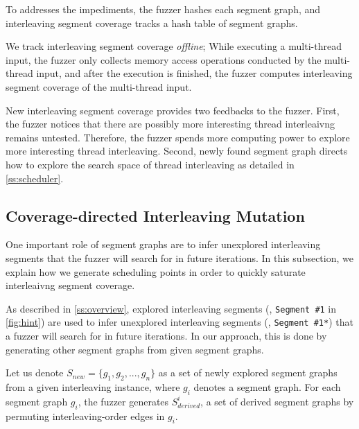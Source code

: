 To addresses the impediments, the fuzzer hashes each segment graph,
and interleaving segment coverage tracks a hash table of segment
graphs.
%





We track interleaving segment coverage \textit{offline}; While
executing a multi-thread input, the fuzzer only collects memory access
operations conducted by the multi-thread input, and after the
execution is finished, the fuzzer computes interleaving segment
coverage of the multi-thread input.


%
New interleaving segment coverage provides two feedbacks to the
fuzzer.
%
First, the fuzzer notices that there are possibly more interesting
thread interleaivng remains untested. Therefore, the fuzzer spends
more computing power to explore more interesting thread interleaving.
%
Second, newly found segment graph directs how to explore the search
space of thread interleaving as detailed in \autoref{ss:scheduler}.





\subsection{Coverage-directed Interleaving Mutation}
\label{ss:scheduler}
%
One important role of segment graphs are to infer unexplored
interleaving segments that the fuzzer will search for in future
iterations.
%
In this subsection, we explain how we generate scheduling points in
order to quickly saturate interleaivng segment coverage.

%
As described in \autoref{ss:overview}, explored interleaving segments
(\eg, \texttt{Segment \#1} in \autoref{fig:hint}) are used to infer
unexplored interleaving segments (\eg, \texttt{Segment \#1*}) that a
fuzzer will search for in future iterations.
%
In our approach, this is done by generating other segment graphs from
given segment graphs.

Let us denote $S_{new} = \{g_1, g_2, ..., g_n \}$ as a set of newly
explored segment graphs from a given interleaving instance, where
$g_i$ denotes a segment graph.
%
For each segment graph $g_i$, the fuzzer generates $S^{i}_{derived}$,
a set of derived segment graphs by permuting interleaving-order edges
in $g_i$.



